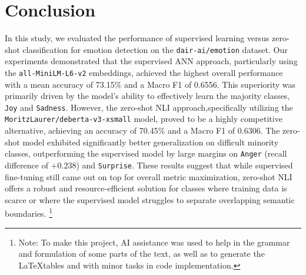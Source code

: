 \documentclass[runningheads]{llncs}
\begin{document}
\section{Conclusion}In this study, we evaluated the performance of supervised learning versus zero-shot classification for emotion detection on the \texttt{dair-ai/emotion} dataset. Our experiments demonstrated that the supervised ANN approach, particularly using the \texttt{all-MiniLM-L6-v2} embeddings, achieved the highest overall performance with a mean accuracy of 73.15\% and a Macro F1 of 0.6556. This superiority was primarily driven by the model's ability to effectively learn the majority classes, \texttt{Joy} and \texttt{Sadness}. However, the zero-shot NLI approach,specifically utilizing the \texttt{MoritzLaurer/deberta-v3-xsmall} model, proved to be a highly competitive alternative, achieving an accuracy of 70.45\% and a Macro F1 of 0.6306. The zero-shot model exhibited significantly better generalization on difficult minority classes, outperforming the supervised model by large margins on \texttt{Anger} (recall difference of $+0.238$) and \texttt{Surprise}. These results suggest that while supervised fine-tuning still came out on top for overall metric maximization, zero-shot NLI offers a robust and resource-efficient solution for classes where training data is scarce or where the supervised model struggles to separate overlapping semantic boundaries.
\footnote{Note: To make this project, AI assistance was used to help in the grammar and formulation of some parts of the text, as well as to generate the \LaTeX  tables and with minor tasks in code implementation.}
\end{document}

